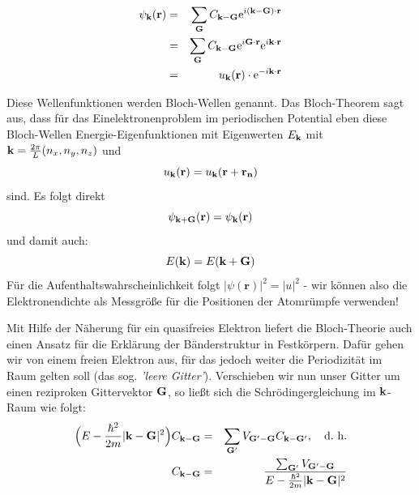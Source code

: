 \begin{eqnarray}
    \psi_{\mathbf{k}}(\mathbf{r})&=& \sum_{\mathbf{G}} C_{\mathbf{k} - \mathbf{G}} \mathrm{e}^{i(\mathbf{k} - \mathbf{G}) \cdot \mathbf{r}} \nonumber \\
            &=& \sum_{\mathbf{G}} C_{\mathbf{k} - \mathbf{G}} \mathrm{e}^{i \mathbf{G} \cdot \mathbf{r}}  \mathrm{e}^{i\mathbf{k} \cdot \mathbf{r}} \nonumber \\
            &=& u_{\mathbf{k}}(\mathbf{r}) \cdot \mathrm{e}^{-i\mathbf{k} \cdot \mathbf{r}} 
\end{eqnarray}

Diese Wellenfunktionen werden Bloch-Wellen genannt. Das Bloch-Theorem sagt aus, 
dass für das Einelektronenproblem im periodischen Potential eben diese Bloch-Wellen 
Energie-Eigenfunktionen mit Eigenwerten $E_{\mathbf{k}}$ mit $\mathbf{k} = \frac{2 \pi}{L} (n_x, n_y, n_z)$ und
\begin{equation}
    u_{\mathbf{k}}(\mathbf{r}) = u_{\mathbf{k}}(\mathbf{r + r_n}) 
\end{equation}
sind. Es folgt direkt 
\begin{equation}
    \psi_{\mathbf{k} + \mathbf{G}}(\mathbf{r}) = \psi_{\mathbf{k}}(\mathbf{r}) 
\end{equation}
und damit auch: 
\begin{equation}
    E(\mathbf{k}) = E(\mathbf{k} + \mathbf{G})
\end{equation}
Für die Aufenthaltswahrscheinlichkeit folgt $|\psi(\mathbf{r})|^2 = |u|^2$ - wir können also 
die Elektronendichte als Messgröße für die Positionen der Atomrümpfe verwenden!

Mit Hilfe der Näherung für ein quasifreies Elektron liefert die Bloch-Theorie auch einen 
Ansatz für die Erklärung der Bänderstruktur in Festkörpern. Dafür gehen wir von einem freien 
Elektron aus, für das jedoch weiter die Periodizität im Raum gelten soll (das sog. \emph{'leere Gitter'}). 
Verschieben wir nun unser Gitter um einen reziproken Gittervektor $\mathbf{G}$, so ließt sich die 
Schrödingergleichung im $\mathbf{k}$-Raum wie folgt:
\begin{eqnarray}
    \Big(E - \frac{\hbar^2}{2m}|\mathbf{k} - \mathbf{G}|^2\Big) C_{\mathbf{k} - \mathbf{G}} &=&
        \sum_{\mathbf{G}'} V_\mathbf{G' - G} C_{\mathbf{k} - \mathbf{G}'}, \quad \mathrm{d.\ h.} \nonumber \\
    \label{eqn:bloch1}    
    C_{\mathbf{k} - \mathbf{G}} &=& \frac{ \sum_{\mathbf{G}'} V_\mathbf{G' - G}}{E - \frac{\hbar^2}{2m}|\mathbf{k} - \mathbf{G}|^2} 
\end{eqnarray}


